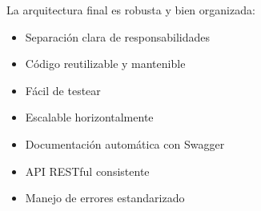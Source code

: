 La arquitectura final es robusta y bien organizada:

\begin{itemize}
    \item[$\checkmark$] Separación clara de responsabilidades
    \item[$\checkmark$] Código reutilizable y mantenible
    \item[$\checkmark$] Fácil de testear
    \item[$\checkmark$] Escalable horizontalmente
    \item[$\checkmark$] Documentación automática con Swagger
    \item[$\checkmark$] API RESTful consistente
    \item[$\checkmark$] Manejo de errores estandarizado
\end{itemize}
